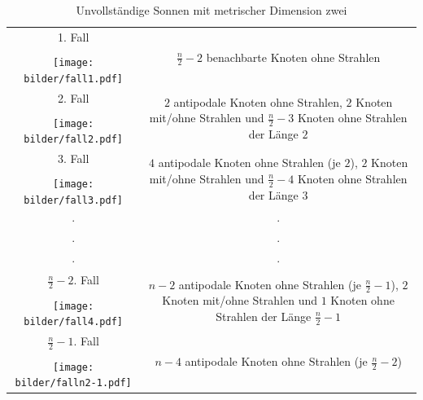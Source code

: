 \begin{table}[htp]
\centering
 \renewcommand{\arraystretch}{2}
\begin{tabularx}{\textwidth}{||c|c||}
\hline\hline
\vspace{0.3mm}
1. Fall& \multirow{3}{121mm}{$\frac{n}{2}-2$ benachbarte Knoten ohne Strahlen}\\
\cline{1-1}
\vspace{-6mm}
&\\
	\texttt{[image: bilder/fall1.pdf]}&\\
\hline\hline
\vspace{0.3mm}
2. Fall&\multirow{3}{121mm}{$2$ antipodale Knoten ohne Strahlen, $2$ Knoten mit/ohne Strahlen und $\frac{n}{2}-3$ Knoten ohne Strahlen der Länge $2$}\\
\cline{1-1}
\vspace{-6mm}&\\
\texttt{[image: bilder/fall2.pdf]}&\\
\hline\hline
\vspace{0.3mm}
3. Fall&\multirow{3}{121mm}{ $4$ antipodale Knoten ohne Strahlen (je $2$), $2$ Knoten mit/ohne Strahlen und $\frac{n}{2}-4$ Knoten ohne Strahlen der Länge $3$}\\
\cline{1-1}
\vspace{-6mm}&\\
\texttt{[image: bilder/fall3.pdf]}&\\
\hline\hline
$\cdot$ &  $\cdot$\\
$\cdot$ &  $\cdot$\\
$\cdot$ &  $\cdot$\\
\hline\hline
\vspace{0.3mm}
$\frac{n}{2}-2$. Fall&\multirow{3}{121mm}{$n-2$ antipodale Knoten ohne Strahlen (je $\frac{n}{2}-1$), $2$ Knoten mit/ohne Strahlen und $1$ Knoten ohne Strahlen der Länge $\frac{n}{2}-1$}\\
\cline{1-1}
\vspace{-6mm}&\\
\texttt{[image: bilder/fall4.pdf]}&\\
\hline\hline
\vspace{0.3mm}
$\frac{n}{2}-1$. Fall&\multirow{3}{121mm}{$n-4$ antipodale Knoten ohne Strahlen (je $\frac{n}{2}-2$)}\\
\cline{1-1}
\vspace{-6mm}&\\
\texttt{[image: bilder/falln2-1.pdf]}&\\
\hline\hline
\end{tabularx}
\caption{Unvollständige Sonnen mit metrischer Dimension zwei}
\label{fallunterscheidungungeradesonnen2md}
\end{table}
